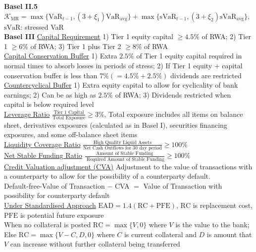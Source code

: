 \documentclass[12pt,landscape, a4paper]{article}
\theoremstyle{remark}
\newcommand{\VaR}{\mathrm{VaR}}
\newcommand{\EAD}{\mathrm{EAD}}
\begin{document}
\begin{multicols*}{3}
\textbf{Basel II.5}$\mathcal{K}_{\mathrm{MR}} = \max \{\VaR_{t-1}, (3+\xi_1) \VaR_{\mathrm{avg}}  \} + \max \{\mathrm{sVaR}_{t-1}, (3+\xi_2) \mathrm{sVaR}_{\mathrm{avg}}  \}  $, $\mathrm{sVaR}$: stressed VaR\\

\textbf{Basel III} 
\underline{Capital Requirement} 1) Tier 1 equity capital $\geq 4.5\%$ of RWA; 2)  Tier 1 $\geq 6\%$ of RWA; 3) Tier 1 plus Tier 2 $\geq 8\%$ of RWA\\
\underline{Capital Conservation Buffer} 1) Extra $2.5 \%$ of Tier 1 equity capital required in normal times to absorb losses in periods of stress; 2) If Tier 1 equity $+$ capital conservation buffer is less than $7\% (=4.5\%+2.5\%)$ dividends are restricted\\

\underline{Countercyclical Buffer} 1) Extra equity capital to allow for cyclicality of bank earnings; 2) Can be as high as $2.5\%$ of RWA; 3) Dividends restricted when capital is below required level\\

\underline{Leverage Ratio} $\frac{\text{Tier 1 Capital}}{\text{Total Exposure}} \geq 3\%$, Total exposure includes all items on balance sheet, derivatives exposures (calculated as in Basel I), securities financing exposures, and some off-balance sheet items\\

\underline{Liquidity Coverage Ratio} $\frac{\text{High Quality Liquid Assets}}{\text{Net Cash Outflows for 30 day period}} \geq 100\%$  \\
\underline{Net Stable Funding Ratio} $\frac{\text{Amount of Stable Funding}}{\text{ Required Amount of Stable Funding}}\geq 100\%$\\

\underline{Credit Valuation adjustment (CVA)} Adjustment to the value of transactions with a counterparty to allow for the possibility of a counterparty default.\\
Default-free-Value of Transaction $-$ CVA $=$ Value of Transaction with possibility for counterparty default\\

\underline{Under Standardised Approach} $\EAD  = 1.4 (\mathrm{RC} + \mathrm{PFE} )$, $\mathrm{RC}$ is replacement cost,  $\mathrm{PFE}$ is potential future exposure\\

When no collateral is posted $\mathrm{RC} =\max \{V, 0 \} $ where $V$ is the value to the bank; Else $\mathrm{RC} =\max \{V-C, D, 0 \} $ where $C$ is current collateral and $D$ is amount that $V$ can increase without further collateral being transferred\\


\end{multicols*}
\end{document}
